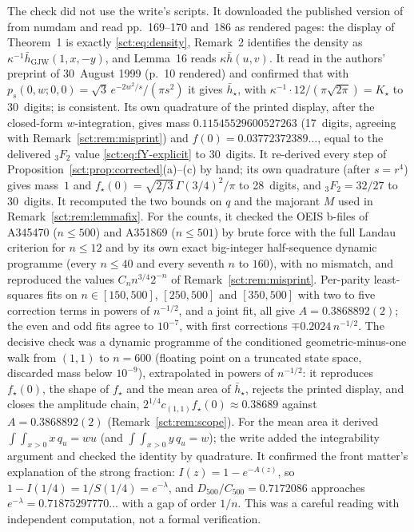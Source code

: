 \documentclass[11pt,letterpaper]{article}
\theoremstyle{definition}\newtheorem{remark}[theorem]{Remark}
\newcommand{\hstar}{\bar h_\star}\newcommand{\fstar}{f_\star}\newcommand{\Kstar}{K_\star}
\begin{document}
The check did not use the write's scripts. It downloaded the published version of \cite{dw} from numdam and read pp.~169--170 and~186 as rendered pages: the display of Theorem~1 is exactly \eqref{sct:eq:density}, Remark~2 identifies the density as $\kappa^{-1}\bar h_{\mathrm{GJW}}(1,x,-y)$, and Lemma~16 reads $\kappa\bar h(u,v)$. It read \cite[(2.24)]{gjw} in the authors' preprint of 30~August 1999 (p.~10 rendered) and confirmed that with $p_s(0,w;0,0)=\sqrt3\,e^{-2w^2/s}/(\pi s^2)$ it gives $\hstar$, with $\kappa^{-1}\cdot12/(\pi\sqrt{2\pi})=\Kstar$ to 30~digits; \cite{bdw} is consistent. Its own quadrature of the printed display, after the closed-form $w$-integration, gives mass $0.11545529600527263$ (17~digits, agreeing with Remark~\ref{sct:rem:misprint}) and $f(0)=0.03772372389\ldots$, equal to the delivered ${}_3F_2$ value \eqref{sct:eq:fY-explicit} to 30~digits. It re-derived every step of Proposition~\ref{sct:prop:corrected}(a)--(c) by hand; its own quadrature (after $s=r^4$) gives mass~$1$ and $\fstar(0)=\sqrt{2/3}\,\Gamma(3/4)^2/\pi$ to 28~digits, and ${}_3F_2=32/27$ to 30~digits. It recomputed the two bounds on $q$ and the majorant $M$ used in Remark~\ref{sct:rem:lemmafix}. For the counts, it checked the OEIS b-files of A345470 ($n\le500$) and A351869 ($n\le501$) by brute force with the full Landau criterion for $n\le12$ and by its own exact big-integer half-sequence dynamic programme (every $n\le40$ and every seventh $n$ to $160$), with no mismatch, and reproduced the values $C_nn^{3/4}2^{-n}$ of Remark~\ref{sct:rem:misprint}. Per-parity least-squares fits on $n\in[150,500]$, $[250,500]$ and $[350,500]$ with two to five correction terms in powers of $n^{-1/2}$, and a joint fit, all give $A=0.3868892(2)$; the even and odd fits agree to $10^{-7}$, with first corrections $\mp0.2024\,n^{-1/2}$. The decisive check was a dynamic programme of the conditioned geometric-minus-one walk from $(1,1)$ to $n=600$ (floating point on a truncated state space, discarded mass below $10^{-9}$), extrapolated in powers of $n^{-1/2}$: it reproduces $\fstar(0)$, the shape of $\fstar$ and the mean area of $\hstar$, rejects the printed display, and closes the amplitude chain, $2^{1/4}c_{(1,1)}\fstar(0)\approx0.38689$ against $A=0.3868892(2)$ (Remark~\ref{sct:rem:scope}). For the mean area it derived $\int\!\!\int_{x>0}x\,q_u=wu$ (and $\int\!\!\int_{x>0}y\,q_u=w$); the write added the integrability argument and checked the identity by quadrature. It confirmed the front matter's explanation of the strong fraction: $I(z)=1-e^{-A(z)}$, so $1-I(1/4)=1/S(1/4)=e^{-\lambda}$, and $D_{500}/C_{500}=0.7172086$ approaches $e^{-\lambda}=0.71875297770\ldots$ with a gap of order $1/n$. This was a careful reading with independent computation, not a formal verification.
\end{document}
